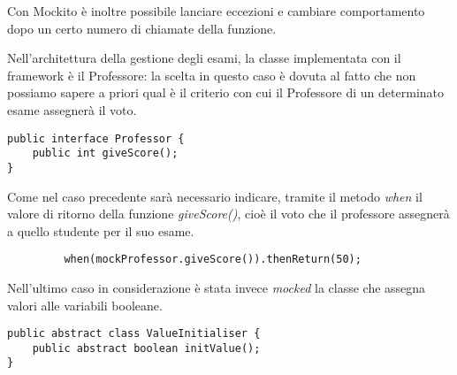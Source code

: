 Con Mockito è inoltre possibile lanciare eccezioni e cambiare comportamento dopo un certo numero di chiamate della funzione.


Nell'architettura della gestione degli esami, la classe implementata con il framework è il Professore: la scelta in questo caso è dovuta al fatto che non possiamo sapere a priori qual è il criterio con cui il Professore di un determinato esame assegnerà il voto. 

\begin{lstlisting}
public interface Professor {
	public int giveScore();	
}
\end{lstlisting}

Come nel caso precedente sarà necessario indicare, tramite il metodo \emph{when} il valore di ritorno della funzione \emph{giveScore()}, cioè il voto che il professore assegnerà a quello studente per il suo esame.

\begin{lstlisting}
		 when(mockProfessor.giveScore()).thenReturn(50);
\end{lstlisting}


Nell'ultimo caso in considerazione è stata invece \emph{mocked} la classe che assegna valori alle variabili booleane.

\begin{lstlisting}
public abstract class ValueInitialiser {
	public abstract boolean initValue();	
}
\end{lstlisting}